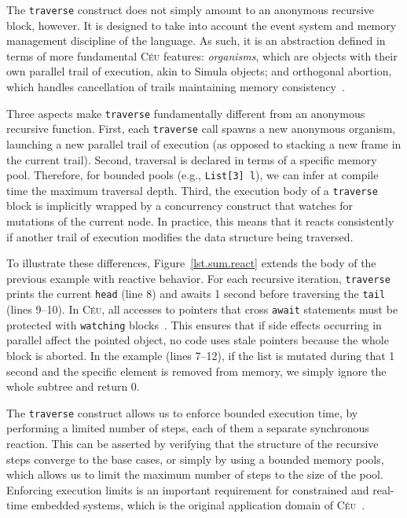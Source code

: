 \documentclass{acm_proc_article-sp}
\newcommand{\CEU}{\textsc{C\'{e}u}\xspace}
\newcommand{\code}[1] {{\small{\texttt{#1}}}}
\begin{document}
The \code{traverse} construct does not simply amount to an anonymous recursive
block, however. It is designed to take into account the event system and
memory management discipline of the language. As such, it is an abstraction
defined in terms of more fundamental \CEU features: \emph{organisms}, which
are objects with their own parallel trail of execution, akin to Simula
objects; and orthogonal abortion, which handles cancellation of trails
maintaining memory consistency~\cite{ceu.mod15}.

Three aspects make \code{traverse} fundamentally different from an anonymous
recursive function. First, each \code{traverse} call spawns a new anonymous
organism, launching a new parallel trail of execution (as opposed to stacking
a new frame in the current trail). Second, traversal is declared in terms of a
specific memory pool. Therefore, for bounded pools (e.g., \code{List[3] l}),
we can infer at compile time the maximum traversal depth. Third, the execution
body of a \code{traverse} block is implicitly wrapped by a concurrency
construct that watches for mutations of the current node. In practice, this
means that it reacts consistently if another trail of execution modifies the
data structure being traversed.

To illustrate these differences, Figure~\ref{lst.sum.react} extends the body
of the previous example with reactive behavior.
For each recursive iteration, \code{traverse} prints the current 
\code{head} (line 8) and awaits 1 second before traversing the \code{tail} 
(lines 9--10).
In \CEU, all accesses to pointers that cross \code{await} statements must be 
protected with \code{watching} blocks~\cite{ceu.mod15}.
This ensures that if side effects occurring in parallel affect the pointed 
object, no code uses stale pointers because the whole block is aborted.
In the example (lines 7--12), if the list is mutated during that 1 second and 
the specific element is removed from memory, we simply ignore the whole subtree 
and return 0.

The \code{traverse} construct allows us to enforce bounded execution time, by
performing a limited number of steps, each of them a separate synchronous
reaction. This can be asserted by verifying that the structure of the
recursive steps converge to the base cases, or simply by using a bounded
memory pools, which allows us to limit the maximum number of steps to the size
of the pool. Enforcing execution limits is an important requirement for
constrained and real-time embedded systems, which is the original application
domain of \CEU~\cite{ceu.sensys13}.
\end{document}
